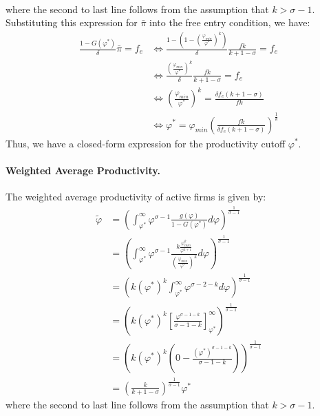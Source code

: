 \begin{solution}
\begin{align*}
    \end{align*}
    where the second to last line follows from the assumption that $k > \sigma - 1$. Substituting this expression for $\bar{\pi}$ into the free entry condition, we have:
    \begin{align*}
        \frac{1-G(\varphi^*)}{\delta} \bar{\pi} = f_e &\iff \frac{1 - (1-(\frac{\varphi_{min}}{\varphi^*})^k)}{\delta} \frac{fk}{k + 1 - \sigma} = f_e \\
        &\iff \frac{(\frac{\varphi_{min}}{\varphi^*})^k}{\delta} \frac{fk}{k + 1 - \sigma} = f_e \\
        &\iff \left(\frac{\varphi_{min}}{\varphi^*}\right)^k = \frac{\delta f_e (k + 1 - \sigma)}{fk} \\
        &\iff \varphi^* = \varphi_{min} \left(\frac{fk}{\delta f_e (k + 1 - \sigma)}\right)^{\frac{1}{k}}
    \end{align*}
    Thus, we have a closed-form expression for the productivity cutoff $\varphi^*$. 

    \paragraph{Weighted Average Productivity.} The weighted average productivity of active firms is given by:
    \begin{align*}
        \tilde{\varphi} &= \left( \int_{\varphi^*}^{\infty} \varphi^{\sigma - 1} \frac{g(\varphi)}{1 - G(\varphi^*)} d\varphi \right)^{\frac{1}{\sigma - 1}} \\
        &= \left( \int_{\varphi^*}^{\infty} \varphi^{\sigma - 1} \frac{k \frac{\varphi_{min}^k}{\varphi^{k+1}}}{\left( \frac{\varphi_{min}}{\varphi^*} \right)^k} d\varphi \right)^{\frac{1}{\sigma - 1}} \\
        &= \left( k \left(\varphi^*\right)^k \int_{\varphi^*}^{\infty} \varphi^{\sigma - 2 - k} d\varphi \right)^{\frac{1}{\sigma - 1}} \\
        &= \left( k \left(\varphi^*\right)^k \left[ \frac{\varphi^{\sigma - 1 - k}}{\sigma - 1 - k} \right]_{\varphi^*}^{\infty} \right)^{\frac{1}{\sigma - 1}} \\
        &= \left( k \left(\varphi^*\right)^k \left( 0 - \frac{(\varphi^*)^{\sigma - 1 - k}}{\sigma - 1 - k} \right) \right)^{\frac{1}{\sigma - 1}} \\
        &= \left( \frac{k}{k + 1 - \sigma} \right)^{\frac{1}{\sigma - 1}} \varphi^* 
    \end{align*}
    where the second to last line follows from the assumption that $k > \sigma - 1$.


\end{solution}
